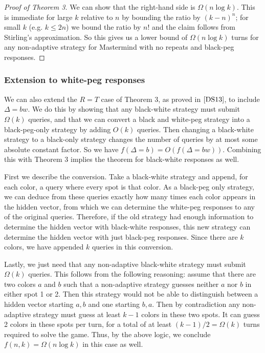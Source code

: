 \documentclass[12pt, a4paper]{article}
\begin{document}
\begin{proof}[Proof of Theorem 3]
	We can show that the right-hand side is $\Omega(n\log k)$. This is immediate for large $k$ relative to $n$ by bounding the ratio by $(k-n)^n$; for small $k$ (e.g. $k \leq 2n$) we bound the ratio by $n!$ and the claim follows from Stirling's approximation. So this gives us a lower bound of $\Omega(n \log k)$ turns for any non-adaptive strategy for Mastermind with no repeats and black-peg responses.
\end{proof}
\subsubsection{Extension to white-peg responses}
We can also extend the $R=T$ case of Theorem 3, as proved in $\cite{DS13}$, to include $\Delta = bw$. We do this by showing that any black-white strategy must submit $\Omega(k)$ queries, and that we can convert a black and white-peg strategy into a black-peg-only strategy by adding $O(k)$ queries. 
Then changing a black-white strategy to a black-only strategy changes the number of queries by at most some absolute constant factor. So we have $f(\Delta = b) = O(f(\Delta = bw))$. Combining this with Theorem 3 implies the theorem for black-white responses as well.

First we describe the conversion. Take a black-white strategy and append, for each color, a query where every spot is that color. As a black-peg only strategy, we can deduce from these queries exactly how many times each color appears in the hidden vector, from which we can determine the white-peg responses to any of the original queries. Therefore, if the old strategy had enough information to determine the hidden vector with black-white responses, this new strategy can determine the hidden vector with just black-peg responses. Since there are $k$ colors, we have appended $k$ queries in this conversion. 

Lastly, we just need that any non-adaptive black-white strategy must submit $\Omega(k)$ queries. This follows from the following reasoning: assume that there are two colors $a$ and $b$ such that a non-adaptive strategy guesses neither $a$ nor $b$ in either spot 1 or 2. Then this strategy would not be able to distinguish between a hidden vector starting $a,b$ and one starting $b,a$. Then by contradiction any non-adaptive strategy must guess at least $k-1$ colors in these two spots. It can guess 2 colors in these spots per turn, for a total of at least $(k-1)/2 = \Omega(k)$ turns required to solve the game. Thus, by the above logic, we conclude $f(n,k) = \Omega(n \log k)$ in this case as well.
\end{document}
